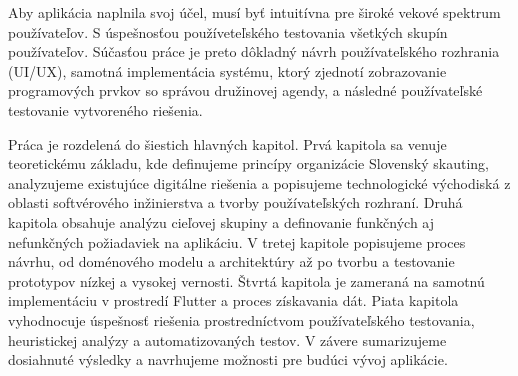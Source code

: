 Aby aplikácia naplnila svoj účel, musí byť intuitívna pre široké vekové spektrum používateľov. S úspešnosťou používeteľského testovania všetkých skupín používateľov. Súčasťou práce je preto dôkladný návrh používateľského rozhrania (UI/UX), samotná implementácia systému, ktorý zjednotí zobrazovanie programových prvkov so správou družinovej agendy, a následné používateľské testovanie vytvoreného riešenia.

Práca je rozdelená do šiestich hlavných kapitol. Prvá kapitola sa venuje teoretickému základu, kde definujeme princípy organizácie Slovenský skauting, analyzujeme existujúce digitálne riešenia a popisujeme technologické východiská z oblasti softvérového inžinierstva a tvorby používateľských rozhraní. Druhá kapitola obsahuje analýzu cieľovej skupiny a definovanie funkčných aj nefunkčných požiadaviek na aplikáciu. V tretej kapitole popisujeme proces návrhu, od doménového modelu a architektúry až po tvorbu a testovanie prototypov nízkej a vysokej vernosti. Štvrtá kapitola je zameraná na samotnú implementáciu v prostredí Flutter a proces získavania dát. Piata kapitola vyhodnocuje úspešnosť riešenia prostredníctvom používateľského testovania, heuristickej analýzy a automatizovaných testov. V závere sumarizujeme dosiahnuté výsledky a navrhujeme možnosti pre budúci vývoj aplikácie.